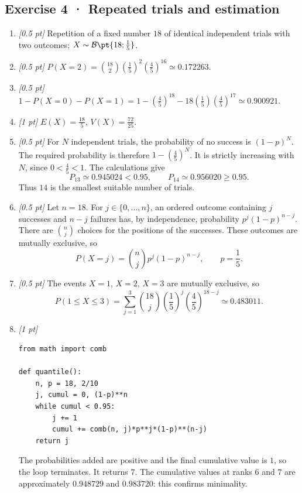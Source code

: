 \subsection*{Exercise 4 · Repeated trials and estimation}\begin{enumerate}

\item \textit{[0.5 pt]} Repetition of a fixed number $18$ of identical independent trials with two outcomes; $X\sim\mathcal B\pt{18;\frac{1}{5}}$.

\item \textit{[0.5 pt]} $P(X=2)=\binom{18}2(\frac{1}{5})^2(\frac{4}{5})^{16}\simeq\num{0,172263}$.

\item \textit{[0.5 pt]} $1-P(X=0)-P(X=1)=1-(\frac{4}{5})^{18}-18(\frac{1}{5})(\frac{4}{5})^{17}\simeq\num{0,900921}$.

\item \textit{[1 pt]} $E(X)=\frac{18}{5}$, $V(X)=\frac{72}{25}$.

\item \textit{[0.5 pt]} For $N$ independent trials, the probability of no success is $(1-p)^N$. The required probability is therefore $1-(\frac{4}{5})^N$. It is strictly increasing with $N$, since $0<\frac{4}{5}<1$. The calculations give
\[P_{13}\simeq\num{0,945024}<\num{0,95},\qquad P_{14}\simeq\num{0,956020}\ge\num{0,95}.\]
Thus $14$ is the smallest suitable number of trials.

\item \textit{[0.5 pt]} Let $n=18$. For $j\in\{0,\ldots,n\}$, an ordered outcome containing $j$ successes and $n-j$ failures has, by independence, probability $p^j(1-p)^{n-j}$. There are $\binom nj$ choices for the positions of the successes. These outcomes are mutually exclusive, so
\[P(X=j)=\binom nj p^j(1-p)^{n-j},\qquad p=\frac{1}{5}.\]

\item \textit{[0.5 pt]} The events $X=1$, $X=2$, $X=3$ are mutually exclusive, so
\[P(1\le X\le3)=\sum_{j=1}^3\binom{18}j(\frac{1}{5})^j(\frac{4}{5})^{18-j}\simeq\num{0,483011}.\]


\item \textit{[1 pt]} 
\begin{lstlisting}
from math import comb

def quantile():
    n, p = 18, 2/10
    j, cumul = 0, (1-p)**n
    while cumul < 0.95:
        j += 1
        cumul += comb(n, j)*p**j*(1-p)**(n-j)
    return j
\end{lstlisting}
The probabilities added are positive and the final cumulative value is $1$, so the loop terminates. It returns $7$. The cumulative values at ranks $6$ and $7$ are approximately $\num{0,948729}$ and $\num{0,983720}$: this confirms minimality.

\end{enumerate}

